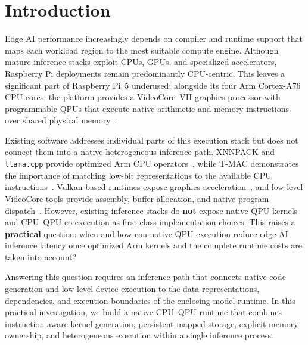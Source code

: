 \documentclass[sigplan,screen,review]{acmart}
\begin{document}

\maketitle

\section{Introduction}

Edge AI performance increasingly depends on compiler and runtime support that maps each workload region to the most suitable compute engine. Although mature inference stacks exploit CPUs, GPUs, and specialized accelerators, Raspberry Pi deployments remain predominantly CPU-centric. This leaves a significant part of Raspberry Pi~5 underused: alongside its four Arm Cortex-A76 CPU cores, the platform provides a VideoCore~VII graphics processor with programmable QPUs that execute native arithmetic and memory instructions over shared physical memory~\cite{rpi5product,rpi5processor}.

Existing software addresses individual parts of this execution stack but does not connect them into a native heterogeneous inference path. XNNPACK and \texttt{llama.cpp} provide optimized Arm CPU operators~\cite{xnnpack,llamacpp}, while T-MAC demonstrates the importance of matching low-bit representations to the available CPU instructions~\cite{tmac}. Vulkan-based runtimes expose graphics acceleration~\cite{ncnn}, and low-level VideoCore tools provide assembly, buffer allocation, and native program dispatch~\cite{pyvideocore7,v3dlib}. However, existing inference stacks do \textbf{not} expose native QPU kernels and CPU--QPU co-execution as first-class implementation choices. This raises a \textbf{practical} question: when and how can native QPU execution reduce edge AI inference latency once optimized Arm kernels and the complete runtime costs are taken into account?

Answering this question requires an inference path that connects native code generation and low-level device execution to the data representations, dependencies, and execution boundaries of the enclosing model runtime. In this practical investigation, we build a native CPU--QPU runtime that combines instruction-aware kernel generation, persistent mapped storage, explicit memory ownership, and heterogeneous execution within a single inference process. 
\end{document}
